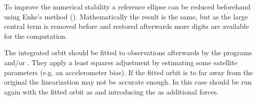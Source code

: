 To improve the numerical stability a reference ellipse can be reduced beforehand using Enke's method ().
Mathematically the result is the same, but as the large central term is removed before and restored
afterwards more digits are available for the computation.

The integrated orbit should be fitted to observations afterwards by the programs
 and/or .
They apply a least squares adjustment by estimating some satellite parameters (e.g. an accelerometer bias).
If the fitted orbit is to far away from the original  the linearization may not be
accurate enough. In this case  should be run again with the fitted orbit
as  and introducing the  as additional forces.


